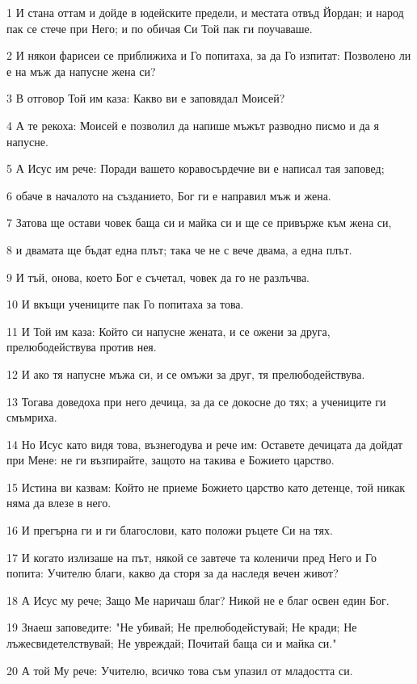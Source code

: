 \par 1 И стана оттам и дойде в юдейските предели, и местата отвъд Йордан; и народ пак се стече при Него; и по обичая Си Той пак ги поучаваше.
\par 2 И някои фарисеи се приближиха и Го попитаха, за да Го изпитат: Позволено ли е на мъж да напусне жена си?
\par 3 В отговор Той им каза: Какво ви е заповядал Моисей?
\par 4 А те рекоха: Моисей е позволил да напише мъжът разводно писмо и да я напусне.
\par 5 А Исус им рече: Поради вашето коравосърдечие ви е написал тая заповед;
\par 6 обаче в началото на създанието, Бог ги е направил мъж и жена.
\par 7 Затова ще остави човек баща си и майка си и ще се привърже към жена си,
\par 8 и двамата ще бъдат една плът; така че не с вече двама, а една плът.
\par 9 И тъй, онова, което Бог е съчетал, човек да го не разлъчва.
\par 10 И вкъщи учениците пак Го попитаха за това.
\par 11 И Той им каза: Който си напусне жената, и се ожени за друга, прелюбодействува против нея.
\par 12 И ако тя напусне мъжа си, и се омъжи за друг, тя прелюбодействува.
\par 13 Тогава доведоха при него дечица, за да се докосне до тях; а учениците ги смъмриха.
\par 14 Но Исус като видя това, възнегодува и рече им: Оставете дечицата да дойдат при Мене: не ги възпирайте, защото на такива е Божието царство.
\par 15 Истина ви казвам: Който не приеме Божието царство като детенце, той никак няма да влезе в него.
\par 16 И прегърна ги и ги благослови, като положи ръцете Си на тях.
\par 17 И когато излизаше на път, някой се завтече та коленичи пред Него и Го попита: Учителю благи, какво да сторя за да наследя вечен живот?
\par 18 А Исус му рече; Защо Ме наричаш благ? Никой не е благ освен един Бог.
\par 19 Знаеш заповедите: "Не убивай; Не прелюбодейстувай; Не кради; Не лъжесвидетелствувай; Не увреждай; Почитай баща си и майка си."
\par 20 А той Му рече: Учителю, всичко това съм упазил от младостта си.
